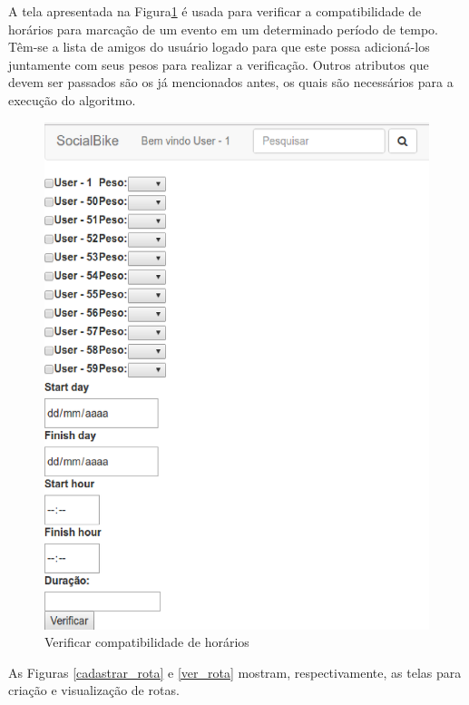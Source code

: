 A tela apresentada na Figura\ref{compatibilidade_horarios} é usada para verificar a compatibilidade de horários para marcação de um evento em um determinado período de tempo. Têm-se a lista de amigos do usuário logado para que este possa adicioná-los juntamente com seus pesos para realizar a verificação. Outros atributos que devem ser passados são os já mencionados antes, os quais são necessários para a execução do algoritmo.

\newpage
\begin{figure}[!h]
	\centering
	\includegraphics[scale=0.5]{figuras/resultados/compatibilidade_horarios.eps}
	\caption[Verificar compatibilidade de horários]{Verificar compatibilidade de horários}
	\label{compatibilidade_horarios}
\end{figure}

As Figuras \ref{cadastrar_rota} e \ref{ver_rota} mostram, respectivamente, as telas para criação e visualização de rotas.

